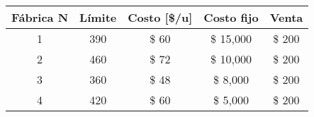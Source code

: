 \begin{tabular}{ccccc}
Fábrica N & Límite & Costo [\$/u] & Costo fijo & Venta \bigstrut[b]\\
\hline
\hline
1      & 390    &  \$            60  &  \$       15,000  &  \$        200  \bigstrut[t]\\
2      & 460    &  \$            72  &  \$       10,000  &  \$        200  \\
3      & 360    &  \$            48  &  \$          8,000  &  \$        200  \\
4      & 420    &  \$            60  &  \$          5,000  &  \$        200  \bigstrut[b]\\
\hline
\hline
\end{tabular}%
